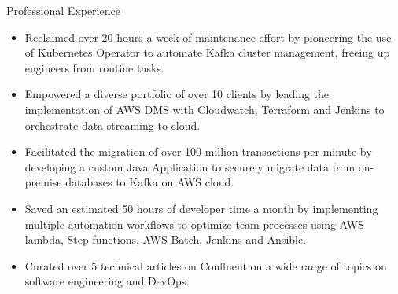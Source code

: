 \documentclass{resume}
\begin{document}
\begin{experienceSection}{Professional Experience}
    \experienceItem[
        company={Tata Consultancy Services},
        location={Mumbai, MH},
        position={System Engineer},
        duration={Aug 2020 - Dec 2022}
    ]
    \begin{itemize}
        \itemsep -6pt {}
        \item Reclaimed over 20 hours a week of maintenance effort by pioneering the use of Kubernetes Operator to automate Kafka cluster management, freeing up engineers from routine tasks.
        \item Empowered a diverse portfolio of over 10 clients by leading the implementation of AWS DMS with Cloudwatch, Terraform and Jenkins to orchestrate data streaming to cloud.
        \item Facilitated the migration of over 100 million transactions per minute by developing a custom Java Application to securely migrate data from on-premise databases to Kafka on AWS cloud.
        \item Saved an estimated 50 hours of developer time a month by implementing multiple automation workflows to optimize team processes using AWS lambda, Step functions, AWS Batch, Jenkins and Ansible.
        \item Curated over 5 technical articles on Confluent on a wide range of topics on software engineering and DevOps.
    \end{itemize}

\end{experienceSection}
\end{document}
